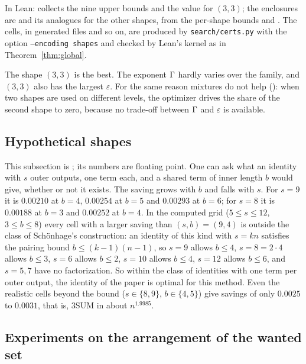 In Lean:  collects the nine upper bounds and the value for
\((3,3)\); the enclosures are  and its
analogues for the other shapes, from the per-shape bounds
 and .  The
\LeanShapesCells{} cells, in \LeanShapesCellFiles{} generated files
 and so on, are produced by
\texttt{search/certs.py} with the option \texttt{--encoding shapes} and
checked by Lean's kernel as in Theorem~\ref{thm:global}.

The shape \((3,3)\) is the best.  The exponent \(\Gamma\) hardly varies over the
family, and \((3,3)\) also has the largest \(\varepsilon\).  For the same
reason mixtures do not help (\nf): when two shapes are used on different
levels, the optimizer drives the share of the second shape to zero, because no
trade-off between \(\Gamma\) and \(\varepsilon\) is available.

\subsection{Hypothetical shapes}

This subsection is \nf; its numbers are floating point.  One can ask what an identity with \(s\) outer outputs, one term each, and a
shared term of inner length \(b\) would give, whether or not it exists.  The
saving grows with \(b\) and falls with \(s\).  For \(s=9\) it is \(0.00210\)
at \(b=4\), \(0.00254\) at \(b=5\) and \(0.00293\) at \(b=6\); for \(s=8\) it is
\(0.00188\) at \(b=3\) and \(0.00252\) at \(b=4\).  In the computed grid (\(5\le s\le12\), \(3\le b\le8\)) every cell with a
larger saving than \((s,b)=(9,4)\) is outside the class of Sch\"onhage's
construction: an identity of this kind with \(s=kn\) satisfies the pairing
bound \(b\le(k-1)(n-1)\), so \(s=9\) allows \(b\le4\), \(s=8=2\cdot4\) allows
\(b\le3\), \(s=6\) allows \(b\le2\), \(s=10\) allows \(b\le4\), \(s=12\) allows
\(b\le6\), and \(s=5,7\) have no factorization.  So within the class of
identities with one term per outer output, the identity of the paper is optimal
for this method.  Even the realistic cells beyond the bound
(\(s\in\{8,9\}\), \(b\in\{4,5\}\)) give savings of only \(0.0025\) to
\(0.0031\), that is, 3SUM in about \(n^{1.9985}\).

\subsection{Experiments on the arrangement of the wanted set}


